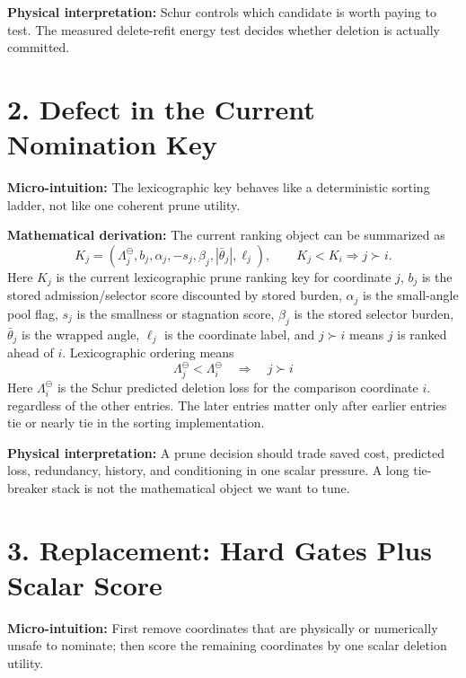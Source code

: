 \documentclass[10pt,twocolumn]{article}
\newcommand{\blk}[1]{\vspace{3pt}\noindent\textbf{#1:}\quad}
\newcommand{\Lam}{\Lambda_j^{\ominus}}
\begin{document}
\blk{Physical interpretation}
Schur controls which candidate is worth paying to test. The measured delete-refit energy test decides whether deletion is actually committed.

\section*{2. Defect in the Current Nomination Key}

\blk{Micro-intuition}
The lexicographic key behaves like a deterministic sorting ladder, not like one coherent prune utility.

\blk{Mathematical derivation}
The current ranking object can be summarized as
\[
K_j=
(\Lam,b_j,\alpha_j,-s_j,\beta_j,|\bar\theta_j|,\ell_j),
\qquad
K_j<K_i\Rightarrow j\succ i.
\]
Here \(K_j\) is the current lexicographic prune ranking key for coordinate \(j\), \(b_j\) is the stored admission/selector score discounted by stored burden, \(\alpha_j\) is the small-angle pool flag, \(s_j\) is the smallness or stagnation score, \(\beta_j\) is the stored selector burden, \(\bar\theta_j\) is the wrapped angle, \(\ell_j\) is the coordinate label, and \(j\succ i\) means \(j\) is ranked ahead of \(i\).
Lexicographic ordering means
\[
\Lam<\Lambda_i^\ominus
\quad\Longrightarrow\quad
j\succ i
\]
Here \(\Lambda_i^\ominus\) is the Schur predicted deletion loss for the comparison coordinate \(i\).
regardless of the other entries. The later entries matter only after earlier entries tie or nearly tie in the sorting implementation.

\blk{Physical interpretation}
A prune decision should trade saved cost, predicted loss, redundancy, history, and conditioning in one scalar pressure. A long tie-breaker stack is not the mathematical object we want to tune.

\section*{3. Replacement: Hard Gates Plus Scalar Score}

\blk{Micro-intuition}
First remove coordinates that are physically or numerically unsafe to nominate; then score the remaining coordinates by one scalar deletion utility.
\end{document}
